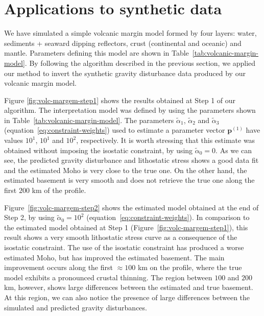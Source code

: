 \documentclass[manuscript]{geophysics}
\begin{document}
\section{Applications to synthetic data}


We have simulated a simple volcanic margin model formed by four layers: 
water, sediments + seaward dipping reflectors, crust (continental and oceanic) 
and mantle. 
Parameters defining this model are shown in Table~\ref{tab:volcanic-margin-model}.
By following the algorithm described in the previous section, we applied our method 
to invert the synthetic gravity disturbance data produced by our volcanic margin model.

Figure \ref{fig:volc-margem-step1} shows the results obtained at Step 1 of our
algorithm.
The interpretation model was defined by using the parameters shown in
Table~\ref{tab:volcanic-margin-model}.
The parameters $\tilde{\alpha}_{1}$, $\tilde{\alpha}_{2}$ and 
$\tilde{\alpha}_{3}$ (equation~\ref{eq:constraint-weights}) used to estimate a parameter 
vector $\mathbf{p}^{(1)}$ have values $10^{1}$, $10^{1}$ and $10^{2}$, respectively.
It is worth stressing that this estimate was obtained without imposing the 
isostatic constraint, by using $\tilde{\alpha}_{0} = 0$.
As we can see, the predicted gravity disturbance and lithostatic stress 
shows a good data fit and the estimated Moho is very close to the true one.
On the other hand, the estimated basement is very smooth and does not
retrieve the true one along the first $200$ km of the profile.

Figure~\ref{fig:volc-margem-step2} shows the estimated model obtained at the end
of Step 2, by using $\tilde{\alpha}_{0} = 10^{2}$ (equation~\ref{eq:constraint-weights}).
In comparison to the estimated model obtained at Step 1 (Figure~\ref{fig:volc-margem-step1}),
this result shows a very smooth lithostatic stress curve as a consequence of the
isostatic constraint. The use of the isostatic constraint has produced a worse estimated Moho, 
but has improved the estimated basement. The main improvement occurs along the 
first $\approx 100$ km on the profile, where the true model exhibits a pronounced crustal
thinning. The region between $100$ and $200$ km, however, shows large 
differences between the estimated and true basement. At this region, we can also
notice the presence of large differences between the simulated and predicted gravity
disturbances.
\end{document}
